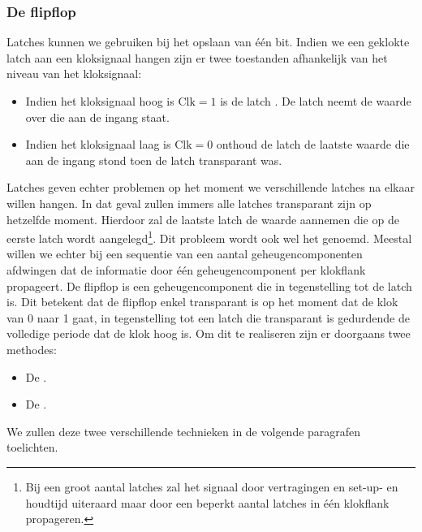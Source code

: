 \subsubsection{De flipflop}
Latches kunnen we gebruiken bij het opslaan van \'e\'en bit. Indien we een geklokte latch aan een kloksignaal hangen zijn er twee toestanden afhankelijk van het niveau van het kloksignaal:
\begin{itemize}
 \item Indien het kloksignaal hoog is $\mbox{Clk}=1$ is de latch . De latch neemt de waarde over die aan de ingang staat.
 \item Indien het kloksignaal laag is $\mbox{Clk}=0$ onthoud de latch de laatste waarde die aan de ingang stond toen de latch transparant was.
\end{itemize}
Latches geven echter problemen op het moment we verschillende latches na elkaar willen hangen. In dat geval zullen immers alle latches transparant zijn op hetzelfde moment. Hierdoor zal de laatste latch de waarde aannemen die op de eerste latch wordt aangelegd\footnote{Bij een groot aantal latches zal het signaal door vertragingen en set-up- en houdtijd uiteraard maar door een beperkt aantal latches in \'e\'en klokflank propageren.}. Dit probleem wordt ook wel het  genoemd. Meestal willen we echter bij een sequentie van een aantal geheugencomponenten afdwingen dat de informatie door \'e\'en geheugencomponent per klokflank propageert. De flipflop is een geheugencomponent die in tegenstelling tot de latch  is. Dit betekent dat de flipflop enkel transparant is op het moment dat de klok van 0 naar 1 gaat, in tegenstelling tot een latch die transparant is gedurdende de volledige periode dat de klok hoog is. Om dit te realiseren zijn er doorgaans twee methodes:
\begin{itemize}
 \item De .
 \item De .
\end{itemize}
We zullen deze twee verschillende technieken in de volgende paragrafen toelichten.

